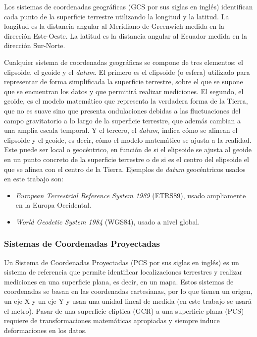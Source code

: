 \documentclass[12pt,a4paper,]{book}
\providecommand{\tightlist}{%
  \setlength{\itemsep}{0pt}\setlength{\parskip}{0pt}}
\numberwithin{dummy}{section}
\theoremstyle{ocrenumbox}
\theoremstyle{blacknumex}
\theoremstyle{blacknumbox}
\theoremstyle{ocrenum}
\theoremstyle{ocrenum}
\begin{document}
Los sistemas de coordenadas geográficas (GCS por sus siglas en inglés)
identifican cada punto de la superficie terrestre utilizando la longitud
y la latitud. La longitud es la distancia angular al Meridiano de
Greenwich medida en la dirección Este-Oeste. La latitud es la distancia
angular al Ecuador medida en la dirección Sur-Norte.

Cualquier sistema de coordenadas geográficas se compone de tres
elementos: el elipsoide, el geoide y el \emph{datum}. El primero es el
elipsoide (o esfera) utilizado para representar de forma simplificada la
superficie terrestre, sobre el que se supone que se encuentran los datos
y que permitirá realizar mediciones. El segundo, el geoide, es el modelo
matemático que representa la verdadera forma de la Tierra, que no es
suave sino que presenta ondulaciones debidas a las fluctuaciones del
campo gravitatorio a lo largo de la superficie terrestre, que además
cambian a una amplia escala temporal. Y el tercero, el \emph{datum},
indica cómo se alinean el elipsoide y el geoide, es decir, cómo el
modelo matemático se ajusta a la realidad. Este puede ser local o
geocéntrico, en función de si el elipsoide se ajusta al geoide en un
punto concreto de la superficie terrestre o de si es el centro del
elipsoide el que se alinea con el centro de la Tierra. Ejemplos de
\emph{datum} geocéntricos usados en este trabajo son:

\begin{itemize}
\tightlist
\item
  \emph{European Terrestrial Reference System 1989} (ETRS89), usado
  ampliamente en la Europa Occidental.
\item
  \emph{World Geodetic System 1984} (WGS84), usado a nivel global.
\end{itemize}

\hypertarget{sistemas-de-coordenadas-proyectadas}{%
\subsubsection{Sistemas de Coordenadas
Proyectadas}\label{sistemas-de-coordenadas-proyectadas}}

Un Sistema de Coordenadas Proyectadas (PCS por sus siglas en inglés) es
un sistema de referencia que permite identificar localizaciones
terrestres y realizar mediciones en una superficie plana, es decir, en
un mapa. Estos sistemas de coordenadas se basan en las coordenadas
cartesianas, por lo que tienen un origen, un eje X y un eje Y y usan una
unidad lineal de medida (en este trabajo se usará el metro). Pasar de
una superficie elíptica (GCR) a una superficie plana (PCS) requiere de
transformaciones matemáticas apropiadas y siempre induce deformaciones
en los datos.
\end{document}
